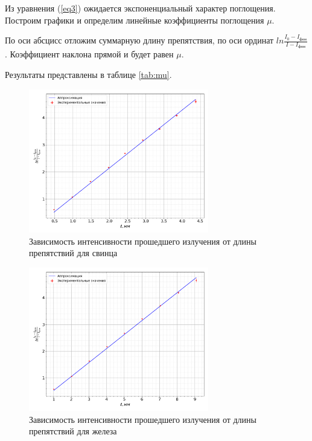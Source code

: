 \documentclass[a4paper, 12pt]{article}
\begin{document}
            Из уравнения (\ref{eq3}) ожидается экспоненциальный характер поглощения. Построим графики и определим линейные коэффициенты поглощения $\mu$.

            По оси абсцисс отложим суммарную длину препятствия, по оси ординат $ln\frac{I_0 - I_{фон}}{I - I_{фон}}$. Коэффициент наклона прямой и будет равен $\mu$.

            Результаты представлены в таблице \ref{tab:mu}.

            \begin{figure}[ht!]
                \begin{center}
                    \includegraphics[width = 0.7\textwidth]{img/Pb.png}
                    \caption{Зависимость интенсивности прошедшего излучения от длины препятствий для свинца}
                    \label{plot:Pb}
                \end{center}
            \end{figure}

            \begin{figure}[ht!]
                \begin{center}
                    \includegraphics[width = 0.7\textwidth]{img/Fe.png}
                    \caption{Зависимость интенсивности прошедшего излучения от длины препятствий для железа}
                    \label{plot:Fe}
                \end{center}
            \end{figure}
\end{document}
